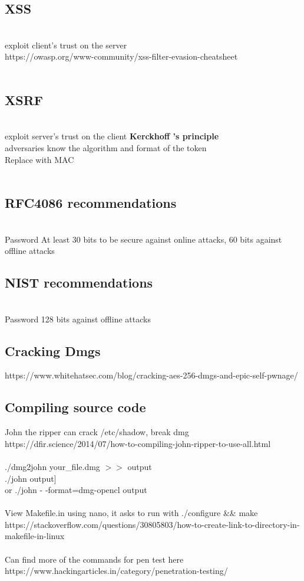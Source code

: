 \documentclass[11pt]{article}
\begin{document}
\begin{multicols*}{3}
\subsection*{XSS}\\
exploit client's trust on the server\\
\textcolor{link}{https://owasp.org/www-community/xss-filter-evasion-cheatsheet}\\\\
\subsection*{XSRF}\\
exploit server's trust on the client
\textbf{Kerckhoff  ’s principle}\\
adversaries know the
algorithm and format of the token\\
Replace with MAC
\\\\
\subsection*{RFC4086 recommendations}\\
Password At least 30 bits to be secure against online attacks, 60 bits against offline attacks \\
\subsection*{NIST recommendations}\\
Password 128 bits against offline attacks 
\subsection*{Cracking Dmgs}
\textcolor{link}{https://www.whitehatsec.com/blog/cracking-aes-256-dmgs-and-epic-self-pwnage/}
\\
\subsection*{Compiling source code}
John the ripper can crack /etc/shadow, break dmg\\
\textcolor{link}{https://dfir.science/2014/07/how-to-compiling-john-ripper-to-use-all.html}\\
\\./dmg2john your\_file.dmg $>>$ output
\\./john output]\\
or ./john - -format=dmg-opencl output\\
\\
View Makefile.in using nano, it asks to run with ./configure && make\\
\textcolor{link}{https://stackoverflow.com/questions/30805803/how-to-create-link-to-directory-in-makefile-in-linux}\\
\\
Can find more of the commands for pen test here\\
\textcolor{link}{https://www.hackingarticles.in/category/penetration-testing/}

\end{multicols*}
\end{document}
